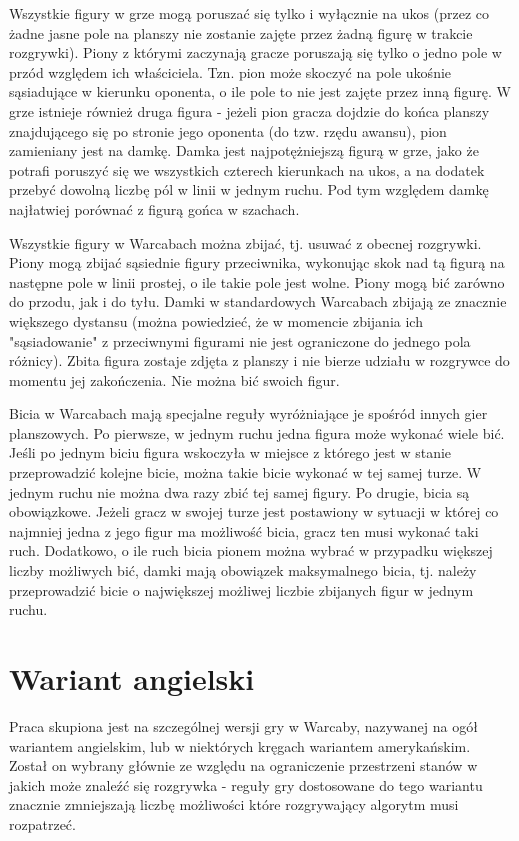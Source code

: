 Wszystkie figury w grze mogą poruszać się tylko i wyłącznie na ukos (przez co żadne jasne pole na planszy nie zostanie zajęte przez żadną figurę w trakcie rozgrywki). Piony z którymi zaczynają gracze poruszają się tylko o jedno pole w przód względem ich właściciela. Tzn. pion może skoczyć na pole ukośnie sąsiadujące w kierunku oponenta, o ile pole to nie jest zajęte przez inną figurę. W grze istnieje również druga figura - jeżeli pion gracza dojdzie do końca planszy znajdującego się po stronie jego oponenta (do tzw. rzędu awansu), pion zamieniany jest na damkę. Damka jest najpotężniejszą figurą w grze, jako że potrafi poruszyć się we wszystkich czterech kierunkach na ukos, a na dodatek przebyć dowolną liczbę pól w linii w jednym ruchu. Pod tym względem damkę najłatwiej porównać z figurą gońca w szachach.

Wszystkie figury w Warcabach można zbijać, tj. usuwać z obecnej rozgrywki. Piony mogą zbijać sąsiednie figury przeciwnika, wykonując skok nad tą figurą na następne pole w linii prostej, o ile takie pole jest wolne. Piony mogą bić zarówno do przodu, jak i do tyłu. Damki w standardowych Warcabach zbijają ze znacznie większego dystansu (można powiedzieć, że w momencie zbijania ich "sąsiadowanie" z przeciwnymi figurami nie jest ograniczone do jednego pola różnicy). Zbita figura zostaje zdjęta z planszy i nie bierze udziału w rozgrywce do momentu jej zakończenia. Nie można bić swoich figur.

Bicia w Warcabach mają specjalne reguły wyróżniające je spośród innych gier planszowych. Po pierwsze, w jednym ruchu jedna figura może wykonać wiele bić. Jeśli po jednym biciu figura wskoczyła w miejsce z którego jest w stanie przeprowadzić kolejne bicie, można takie bicie wykonać w tej samej turze. W jednym ruchu nie można dwa razy zbić tej samej figury. Po drugie, bicia są obowiązkowe. Jeżeli gracz w swojej turze jest postawiony w sytuacji w której co najmniej jedna z jego figur ma możliwość bicia, gracz ten musi wykonać taki ruch. Dodatkowo, o ile ruch bicia pionem można wybrać w przypadku większej liczby możliwych bić, damki mają obowiązek maksymalnego bicia, tj. należy przeprowadzić bicie o największej możliwej liczbie zbijanych figur w jednym ruchu.

\section{Wariant angielski}

Praca skupiona jest na szczególnej wersji gry w Warcaby, nazywanej na ogół wariantem angielskim, lub w niektórych kręgach wariantem amerykańskim. Został on wybrany głównie ze względu na ograniczenie przestrzeni stanów w jakich może znaleźć się rozgrywka - reguły gry dostosowane do tego wariantu znacznie zmniejszają liczbę możliwości które rozgrywający algorytm musi rozpatrzeć.

